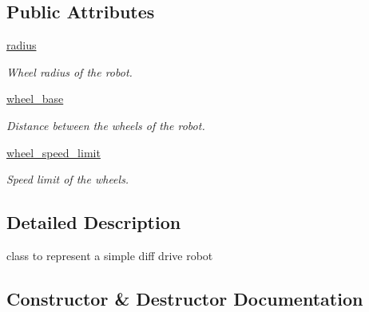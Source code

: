 \subsection*{Public Attributes}
\begin{DoxyCompactItemize}
\item 
\mbox{\label{classmppi__control_1_1mppi__lib_1_1diff__drive__robot_ad5fc7c9c87985d383158121fb2705bcc}} 
\hyperlink{classmppi__control_1_1mppi__lib_1_1diff__drive__robot_ad5fc7c9c87985d383158121fb2705bcc}{radius}
\begin{DoxyCompactList}\small\item\em Wheel radius of the robot. \end{DoxyCompactList}\item 
\mbox{\label{classmppi__control_1_1mppi__lib_1_1diff__drive__robot_af48eec2a0d6e673a3c19b65aa803cbba}} 
\hyperlink{classmppi__control_1_1mppi__lib_1_1diff__drive__robot_af48eec2a0d6e673a3c19b65aa803cbba}{wheel\+\_\+base}
\begin{DoxyCompactList}\small\item\em Distance between the wheels of the robot. \end{DoxyCompactList}\item 
\mbox{\label{classmppi__control_1_1mppi__lib_1_1diff__drive__robot_a6ddb4573599b2d41a59a35fe9e949077}} 
\hyperlink{classmppi__control_1_1mppi__lib_1_1diff__drive__robot_a6ddb4573599b2d41a59a35fe9e949077}{wheel\+\_\+speed\+\_\+limit}
\begin{DoxyCompactList}\small\item\em Speed limit of the wheels. \end{DoxyCompactList}\end{DoxyCompactItemize}


\subsection{Detailed Description}
class to represent a simple diff drive robot 

\subsection{Constructor \& Destructor Documentation}
\mbox{\label{classmppi__control_1_1mppi__lib_1_1diff__drive__robot_a47e8aa290b90853fc9f887e71e0ab605}} 
